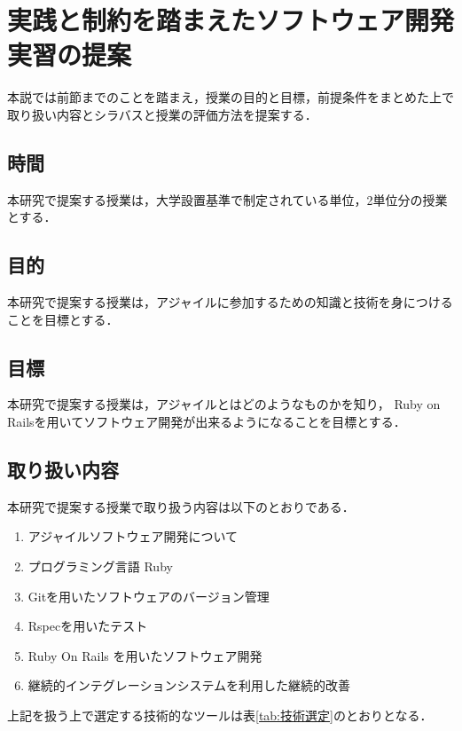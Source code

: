 \section{実践と制約を踏まえたソフトウェア開発実習の提案}

本説では前節までのことを踏まえ，授業の目的と目標，前提条件をまとめた上で取り扱い内容とシラバスと授業の評価方法を提案する．

\subsection{時間}

本研究で提案する授業は，大学設置基準\cite{univ_criteria}で制定されている単位，2単位分の授業とする．

\subsection{目的}

本研究で提案する授業は，アジャイルに参加するための知識と技術を身につけることを目標とする．

\subsection{目標}

本研究で提案する授業は，アジャイルとはどのようなものかを知り， Ruby on Railsを用いてソフトウェア開発が出来るようになることを目標とする．

\subsection{取り扱い内容
  \label{tech-content}
}

本研究で提案する授業で取り扱う内容は以下のとおりである．

\begin{enumerate}
  \item アジャイルソフトウェア開発について
  \item プログラミング言語 Ruby
  \item Gitを用いたソフトウェアのバージョン管理
  \item Rspecを用いたテスト
  \item Ruby On Rails を用いたソフトウェア開発
  \item 継続的インテグレーションシステムを利用した継続的改善
\end{enumerate}

上記を扱う上で選定する技術的なツールは表\ref{tab:技術選定}のとおりとなる．

